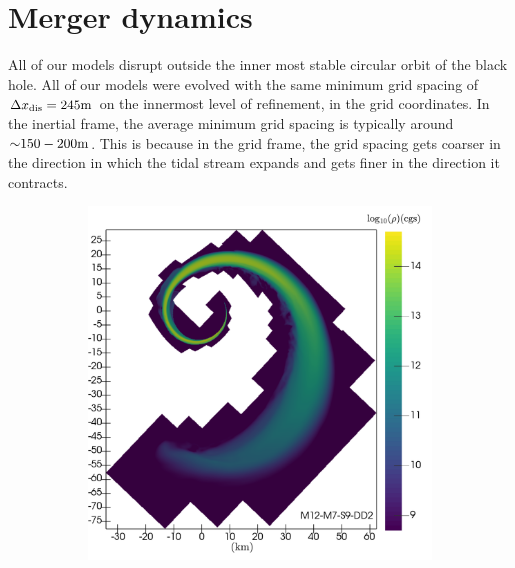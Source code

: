 \section{Merger dynamics}
\label{sec:merger-dynamics}

All of our models disrupt outside the inner most stable circular orbit of the black hole.  
All of our models were evolved with the same minimum grid spacing of $\Delta x_{\rm dis} = 245{\rm m}$ on the innermost level of refinement, in the grid coordinates.  
In the inertial frame, the average minimum grid spacing is typically around $\mathord{\sim} 150-200 {\rm m}$.  
This is because in the grid frame, the grid spacing gets coarser in the direction in which the tidal stream expands and gets finer in the direction it contracts.


\begin{figure}
	\centering
	\begin{subfigure}[b]{0.475\textwidth}
		\centering
		\includegraphics[width=1.0\linewidth]{images/rho_DD2_M12-merger-inertial}
		\label{fig:rho_M12_DD2}
	\end{subfigure}
	\begin{subfigure}[b]{0.475\textwidth}
		\centering

\end{subfigure}
\end{figure}

